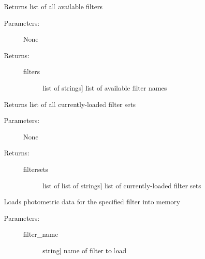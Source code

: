 \documentclass[letterpaper,10pt,english]{sphinxmanual}
\begin{document}
\begin{fulllineitems}
\begin{fulllineitems}
\label{\detokenize{cluster_slug:slugpy.cluster_slug.cluster_slug.filters}}
Returns list of all available filters
\begin{description}
\item[{Parameters:}] \leavevmode
None

\item[{Returns:}] \leavevmode\begin{description}
\item[{filters}] \leavevmode{[}list of strings{]}
list of available filter names

\end{description}

\end{description}

\end{fulllineitems}


\begin{fulllineitems}
\label{\detokenize{cluster_slug:slugpy.cluster_slug.cluster_slug.filtersets}}
Returns list of all currently-loaded filter sets
\begin{description}
\item[{Parameters:}] \leavevmode
None

\item[{Returns:}] \leavevmode\begin{description}
\item[{filtersets}] \leavevmode{[}list of list of strings{]}
list of currently-loaded filter sets

\end{description}

\end{description}

\end{fulllineitems}


\begin{fulllineitems}
\label{\detokenize{cluster_slug:slugpy.cluster_slug.cluster_slug.load_data}}
Loads photometric data for the specified filter into memory
\begin{description}
\item[{Parameters:}] \leavevmode\begin{description}
\item[{filter\_name}] \leavevmode{[}string{]}
name of filter to load


\end{description}
\end{description}
\end{fulllineitems}
\end{fulllineitems}
\end{document}
